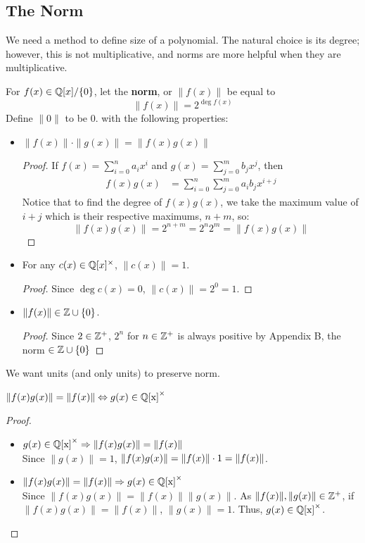 \subsection{The Norm}
We need a method to define size of a polynomial. The natural choice is its degree; however, this is not multiplicative, and norms are more helpful when they are multiplicative.
\begin{definition}
    For $f(x) \in \mathbb{Q}[x] / \{0\}$, let the \textbf{norm}, or $\| f(x)\|$ be equal to \[
    \| f(x) \|  = 2^{\deg{f(x)}}
    \]
    Define $\|0\|$ to be 0.
with the following properties:
\begin{itemize}
    \item $\| f(x)\| \cdot\| g(x)\| = \| f(x)g(x)\|$ 
    \begin{proof}
        If $f(x)=\sum_{i=0}^{n} a_i x^i$ and $g(x)=\sum_{j=0}^{m} b_j x^j$, then 
        \begin{align*}
        f(x)g(x)&=\sum_{i=0}^{n} \sum_{j=0}^{m} a_i b_j x^{i+j}
        \end{align*}
        Notice that to find the degree of $f(x)g(x)$, we take the maximum value of $i+j$ which is their respective maximums, $n+m$, so:
        \[
        \|f(x)g(x)\|=2^{n+m}=2^n2^m = \|f(x)g(x)\|
        \]
    \end{proof}
    \item For any $c(x) \in \mathbb{Q}[x] ^ {\times}$, $\|c(x)\| = 1$.
    \begin{proof} Since $\deg{c(x)} = 0$, $\|c(x)\|=2^0 = 1$.\end{proof}
    \item $\| f(x)\| \in \mathbb{Z} \cup \{0\}$. \begin{proof} 
    Since $2 \in \mathbb{Z}^+$, $2^n$ for $n\in \mathbb{Z}^+$ is always positive by Appendix B, the norm $\in \mathbb{Z} \cup \{0\}$
    \end{proof}
    \end{itemize}
\end{definition}

We want units (and only units) to preserve norm.
\begin{lemma}
    $\|f(x)g(x)\| = \|f(x)\| \Leftrightarrow g(x) \in \operatorname{\mathbb{Q}[x]}^{\times}$ 
\end{lemma}
\begin{proof}   
    \begin{itemize}
        \item  $ g(x) \in \operatorname{\mathbb{Q}[x]}^{\times} \Rightarrow \|f(x)g(x)\| = \|f(x)\|$\\
            Since $\|g(x)\| = 1$, $\|f(x)g(x)\| = \|f(x)\| \cdot 1 = \|f(x)\|$.
        \item $\|f(x)g(x)\| = \|f(x)\| \Rightarrow g(x) \in \operatorname{\mathbb{Q}[x]}^{\times}$ \\
            Since $\|f(x)g(x)\| = \|f(x)\| \|g(x)\|$. As $ \|f(x)\|, \|g(x)\| \in \mathbb{Z}^+$, if $\|f(x)g(x)\| = \|f(x)\|$, $\|g(x)\| = 1$. Thus, $g(x) \in \operatorname{\mathbb{Q}[x]}^{\times}$.
    \end{itemize}
\end{proof}

